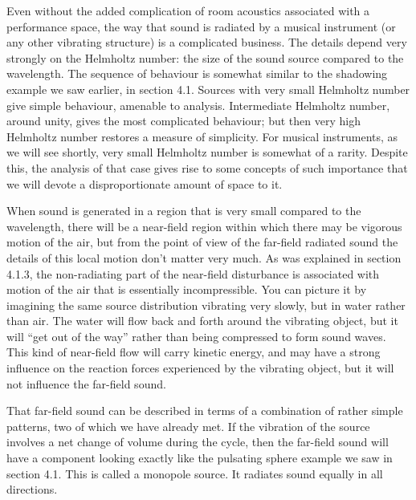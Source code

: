 

  Even without the added complication of room acoustics associated with a 
  performance space, the way that sound is radiated by a musical instrument (or 
  any other vibrating structure) is a complicated business. The details depend 
  very strongly on the Helmholtz number: the size of the sound source compared 
  to the wavelength. The sequence of behaviour is somewhat similar to the 
  shadowing example we saw earlier, in section 4.1. Sources with very small 
  Helmholtz number give simple behaviour, amenable to analysis. Intermediate 
  Helmholtz number, around unity, gives the most complicated behaviour; but 
  then very high Helmholtz number restores a measure of simplicity. For musical 
  instruments, as we will see shortly, very small Helmholtz number is somewhat 
  of a rarity. Despite this, the analysis of that case gives rise to some 
  concepts of such importance that we will devote a disproportionate amount of 
  space to it. 


  When sound is generated in a region that is very small compared to the 
  wavelength, there will be a near-field region within which there may be 
  vigorous motion of the air, but from the point of view of the far-field 
  radiated sound the details of this local motion don't matter very much. As 
  was explained in section 4.1.3, the non-radiating part of the near-field 
  disturbance is associated with motion of the air that is essentially 
  incompressible. You can picture it by imagining the same source distribution 
  vibrating very slowly, but in water rather than air. The water will flow back 
  and forth around the vibrating object, but it will ``get out of the way'' 
  rather than being compressed to form sound waves. This kind of near-field 
  flow will carry kinetic energy, and may have a strong influence on the 
  reaction forces experienced by the vibrating object, but it will not 
  influence the far-field sound. 

  That far-field sound can be described in terms of a combination of rather 
  simple patterns, two of which we have already met. If the vibration of the 
  source involves a net change of volume during the cycle, then the far-field 
  sound will have a component looking exactly like the pulsating sphere example 
  we saw in section 4.1. This is called a monopole source. It radiates sound 
  equally in all directions. 

